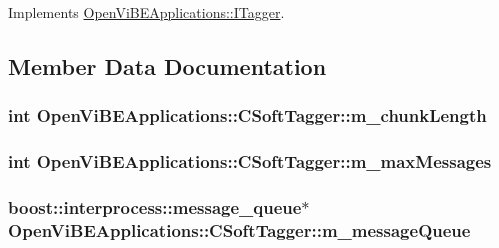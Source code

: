 Implements \hyperlink{classOpenViBEApplications_1_1ITagger_a986aae0747ce120c9fa789bda4ff0178}{OpenViBEApplications::ITagger}.



\subsection{Member Data Documentation}
\hypertarget{classOpenViBEApplications_1_1CSoftTagger_a37a5eb61b3329e4b0e59b251a54e374c}{
\subsubsection[{m\_\-chunkLength}]{\setlength{\rightskip}{0pt plus 5cm}int {\bf OpenViBEApplications::CSoftTagger::m\_\-chunkLength}}}
\label{classOpenViBEApplications_1_1CSoftTagger_a37a5eb61b3329e4b0e59b251a54e374c}
\hypertarget{classOpenViBEApplications_1_1CSoftTagger_a8e23c425a355cc0064f6c87d507084e5}{
\subsubsection[{m\_\-maxMessages}]{\setlength{\rightskip}{0pt plus 5cm}int {\bf OpenViBEApplications::CSoftTagger::m\_\-maxMessages}}}
\label{classOpenViBEApplications_1_1CSoftTagger_a8e23c425a355cc0064f6c87d507084e5}
\hypertarget{classOpenViBEApplications_1_1CSoftTagger_aff273e78a785a463d60890e7d86ec862}{
\subsubsection[{m\_\-messageQueue}]{\setlength{\rightskip}{0pt plus 5cm}boost::interprocess::message\_\-queue$\ast$ {\bf OpenViBEApplications::CSoftTagger::m\_\-messageQueue}}}
